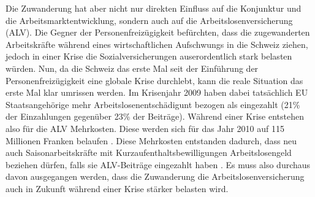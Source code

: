 
Die Zuwanderung hat aber nicht nur  direkten Einfluss auf die Konjunktur und die Arbeitsmarktentwicklung, sondern auch auf die Arbeitslosenversicherung (ALV). 
Die Gegner der Personenfreizügigkeit befürchten, dass die zugewanderten Arbeitskräfte während eines 
wirtschaftlichen Aufschwungs in die Schweiz ziehen, jedoch in einer Krise die Sozialversicherungen 
auserordentlich stark belasten würden.
Nun, da die Schweiz das erste Mal seit der Einführung der Personenfreizügigkeit eine globale Krise 
durchlebt, kann die reale Situation das erste Mal klar umrissen werden. Im Krisenjahr 2009 
haben dabei tatsächlich EU Staatsangehörige mehr Arbeitslosenentschädigunt bezogen als eingezahlt 
(21\% der Einzahlungen gegenüber 23\% der Beiträge). Während einer Krise entstehen
also für die ALV Mehrkosten. Diese werden sich für das Jahr 2010 auf 115 Millionen Franken belaufen \cite[S. 8]{ADMIN:Bericht}.
Diese Mehrkosten entstanden dadurch, dass neu auch Saisonarbeitskräfte mit Kurzaufenthaltsbewilligungen 
Arbeitslosengeld beziehen dürfen, falls sie ALV-Beiträge eingezahlt haben \cite[S. 46]{ADMIN:Auswirkungen}.
Es muss also durchaus davon ausgegangen werden, dass die Zuwanderung die Arbeitslosenversicherung auch in 
Zukunft während einer Krise stärker belasten wird.
